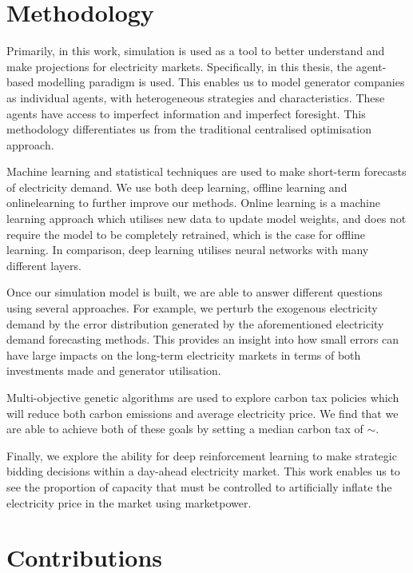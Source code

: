 \section{Methodology}

Primarily, in this work, simulation is used as a tool to better understand and make projections for electricity markets. Specifically, in this thesis, the agent-based modelling paradigm is used. This enables us to model generator companies as individual agents, with heterogeneous strategies and characteristics. These agents have access to imperfect information and imperfect foresight. This methodology differentiates us from the traditional centralised optimisation approach.

Machine learning and statistical techniques are used to make short-term forecasts of electricity demand. We use both deep learning, offline learning and \gls{onlinelearning} to further improve our methods. Online learning is a machine learning approach which utilises new data to update model weights, and does not require the model to be completely retrained, which is the case for offline learning. In comparison, deep learning utilises neural networks with many different layers. 

Once our simulation model is built, we are able to answer different questions using several approaches. For example, we perturb the exogenous electricity demand by the error distribution generated by the aforementioned electricity demand forecasting methods. This provides an insight into how small errors can have large impacts on the long-term electricity markets in terms of both investments made and generator utilisation.

Multi-objective genetic algorithms are used to explore carbon tax policies which will reduce both carbon emissions and average electricity price. We find that we are able to achieve both of these goals by setting a median carbon tax of ${\sim}$.

Finally, we explore the ability for deep reinforcement learning to make strategic bidding decisions within a day-ahead electricity market. This work enables us to see the proportion of capacity that must be controlled to artificially inflate the electricity price in the market using \gls{marketpower}. 

\section{Contributions}

